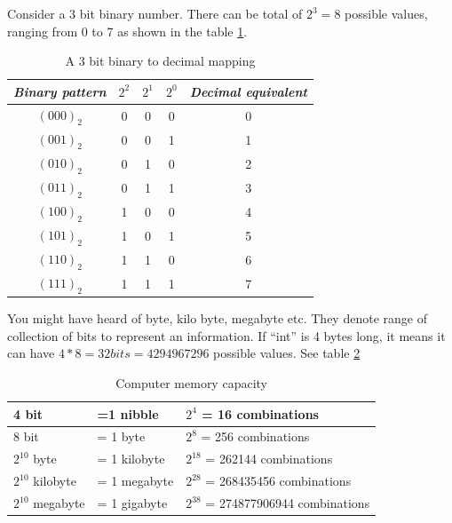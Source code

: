 \par Consider a 3 bit binary number. There can be total of $2^3 = 8$ possible values, ranging from 0 to 7 as shown in the table \ref{tab:binary}.

\begin{table}
    \centering
     \renewcommand{\arraystretch}{1.5}
    \begin{tabular}{|c|c|c|c|c|}
    \hline
        \textbf{\textit{Binary pattern}} & \textbf{\textit{$2^2$}} & \textbf{\textit{$2^1$}} & \textbf{\textit{$2^0$}} & \textbf{\textit{Decimal equivalent }}\\ \hline
        $(000)_2$ & 0 & 0 & 0 & 0 \\ \hline
        $(001)_2$ & 0 & 0 & 1 & 1 \\ \hline
        $(010)_2$ & 0 & 1 & 0 & 2 \\ \hline
        $(011)_2$ & 0 & 1 & 1 & 3 \\ \hline
        $(100)_2$ & 1 & 0 & 0 & 4 \\ \hline
        $(101)_2$ & 1 & 0 & 1 & 5 \\ \hline
        $(110)_2$ & 1 & 1 & 0 & 6 \\ \hline
        $(111)_2$ & 1 & 1 & 1 & 7 \\ \hline
    \end{tabular}
    \caption[Binary system]{A 3 bit binary to decimal mapping}
    \label{tab:binary}
\end{table}

\vspace{5mm}
\par You might have heard of byte, kilo byte, megabyte etc. They denote range of collection of bits to represent an information. If “int” is 4 bytes long, it means it can have $4*8 = 32bits = 4294967296$ possible values. See table \ref{fig:memory_size}

\begin{table}
    \centering
    \renewcommand{\arraystretch}{1.5}
    \begin{tabular}{|l|l|l|}
    \hline
        4 bit &  =1 nibble & $2^4$ = 16                                     combinations \\ \hline
        8 bit & = 1 byte & $2^8$ = 256                                   combinations \\ \hline
        $2^{10}$ byte & = 1 kilobyte & $2^{18}$ = 262144                           combinations \\ \hline
        $2^{10}$ kilobyte & = 1 megabyte & $2^{28}$ = 268435456                     combinations \\ \hline
        $2^{10}$ megabyte & = 1 gigabyte & $2^{38}$ = 274877906944               combinations \\ \hline
    \end{tabular}
    \caption[Memory size]{Computer memory capacity}
    \label{fig:memory_size}
\end{table}

